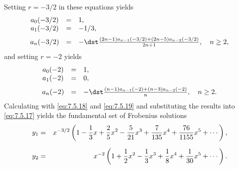 \begin{examplesolution}
Setting $r=-3/2$ in these equations yields
\begin{equation}
  \label{eq:7.5.18}
  \begin{array}{ccl}
    a_{0}(-3/2) & = & 1,                                                                      \\
    a_{1}(-3/2) & = & -1/3,                                                                   \\[2\jot]
    a_{n}(-3/2) & = & -\dst\frac{(2n-1)a_{n-1}(-3/2)+ (2n-5)a_{n-2}(-3/2)}{2n+1},\quad n\ge2,
  \end{array}
\end{equation}
and setting $r=-2$ yields
\begin{equation}
  \label{eq:7.5.19}
  \begin{array}{ccl}
    a_{0}(-2) & = & 1,                                                            \\
    a_{1}(-2) & = & 0,                                                            \\[2\jot]
    a_{n}(-2) & = & -\dst\frac{(n-1)a_{n-1}(-2)+(n-3)a_{n-2}(-2)}{n},\quad n\ge2.
  \end{array}
\end{equation}
Calculating with \eqref{eq:7.5.18} and \eqref{eq:7.5.19} and substituting the results into
\eqref{eq:7.5.17} yields the fundamental set of Frobenius solutions
\begin{eqnarray*}
  y_{1} & = & x^{-3/2}\left(1-\frac{1}{3}x+\frac{2}{5}x^{2}-\frac{5}{21}x^{3}+\frac{7}{135}x^{4}+\frac{76}{1155}x^{5}+\cdots\right), \\[2\jot]
  y_{2} & = & x^{-2}\left(1+\frac{1}{2}x^{2}-\frac{1}{3}x^{3}+\frac{1}{8}x^{4}+\frac{1}{30}x^{5}+\cdots\right).
\end{eqnarray*}
\end{examplesolution}

